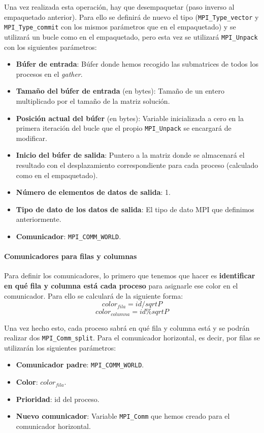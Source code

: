 Una vez realizada esta operación, hay que desempaquetar (paso inverso al empaquetado anterior). Para ello se definirá de nuevo el tipo (\texttt{MPI\_Type\_vector} y \texttt{MPI\_Type\_commit} con los mismos parámetros que en el empaquetado) y se utilizará un bucle como en el empaquetado, pero esta vez se utilizará \texttt{MPI\_Unpack} con los siguientes parámetros:
\begin{itemize}
	\item \textbf{Búfer de entrada}: Búfer donde hemos recogido las submatrices de todos los procesos en el \textit{gather}.
	\item \textbf{Tamaño del búfer de entrada} (en bytes): Tamaño de un entero multiplicado por el tamaño de la matriz solución.
	\item \textbf{Posición actual del búfer} (en bytes): Variable inicializada a cero en la primera iteración del bucle que el propio \texttt{MPI\_Unpack} se encargará de modificar.
	\item \textbf{Inicio del búfer de salida}: Puntero a la matriz donde se almacenará el resultado con el desplazamiento correspondiente para cada proceso (calculado como en el empaquetado).
	\item \textbf{Número de elementos de datos de salida}: 1.
	\item \textbf{Tipo de dato de los datos de salida}: El tipo de dato MPI que definimos anteriormente.
	\item \textbf{Comunicador}: \texttt{MPI\_COMM\_WORLD}.
\end{itemize}

\paragraph{Comunicadores para filas y columnas}

Para definir los comunicadores, lo primero que tenemos que hacer es \textbf{identificar en qué fila y columna está cada proceso} para asignarle ese color en el comunicador. Para ello se calculará de la siguiente forma:
\[ color_{fila} = id / sqrt{P} \]
\[ color_{columna} = id \% sqrt{P} \]

Una vez hecho esto, cada proceso sabrá en qué fila y columna está y se podrán realizar dos \texttt{MPI\_Comm\_split}. Para el comunicador horizontal, es decir, por filas se utilizarán los siguientes parámetros:
\begin{itemize}
	\item \textbf{Comunicador padre}: \texttt{MPI\_COMM\_WORLD}.
	\item \textbf{Color}: $ color_{fila} $.
	\item \textbf{Prioridad}: id del proceso.
	\item \textbf{Nuevo comunicador}: Variable \texttt{MPI\_Comm} que hemos creado para el comunicador horizontal.
\end{itemize}

